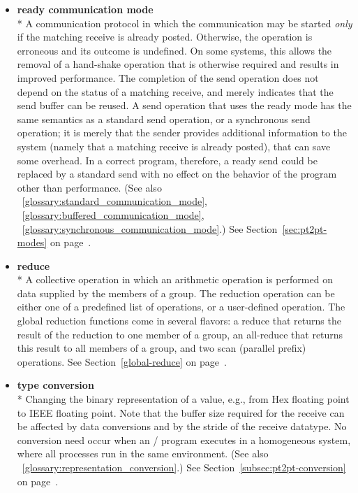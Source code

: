 \begin{itemize}
\label{glossary:ready_communication_mode}
\item \textbf{ ready communication mode} \\*
A communication protocol in which the communication
may be started {\em only} if the matching receive is already posted.
Otherwise, the operation is erroneous and its outcome is undefined.
On some systems, this allows the removal of a hand-shake
operation that is otherwise required and results in improved
performance.
The completion of the send operation does not depend on the
status of a matching receive, and merely indicates that the send
buffer can be reused.   A send operation that uses the ready mode has
the same semantics as a standard send operation, or a synchronous send
operation; it is merely that the sender provides additional
information to the system (namely that a matching receive is already
posted), that can save some overhead.  In a correct program, therefore, a
ready send could be replaced by a standard send with no effect on the
behavior of the program other than performance.
(See also ~\ref{glossary:standard_communication_mode}, 
~\ref{glossary:buffered_communication_mode},
~\ref{glossary:synchronous_communication_mode}.)
See Section~\ref{sec:pt2pt-modes} on page~\pageref{sec:pt2pt-modes}.


\label{glossary:reduce}
\item \textbf{ reduce} \\*
A collective operation in which an 
arithmetic operation is performed on data supplied by the members of a group.
The reduction operation can be either one of a predefined list of
operations, or a user-defined operation.
The global reduction functions come in several flavors: a reduce that
returns the result of the reduction
to one member of a group,
an all-reduce that
returns this result
to all members of a group,
and 
two 
scan (parallel prefix) 
operations.  
See Section~\ref{global-reduce} on page~\pageref{global-reduce}.

\label{glossary:representation_conversion}
\item \textbf{ type conversion} \\*
Changing the binary representation of a value,
e.g., from Hex floating point to IEEE floating point. Note that the buffer size required for the receive can be affected by data conversions and
by the stride of the receive datatype. No conversion need occur when an \MPI/ program executes in
a homogeneous system, where all processes run in the same environment. (See also ~\ref{glossary:representation_conversion}.)
See Section~\ref{subsec:pt2pt-conversion} on page~\pageref{subsec:pt2pt-conversion}.


\end{itemize}
